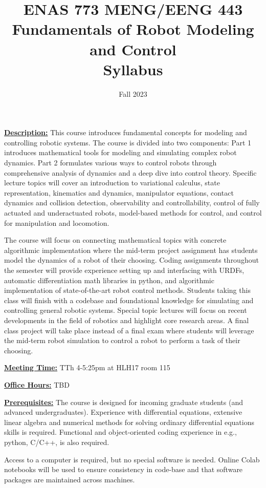 \documentclass[11pt,letterpaper]{article}
\title{ENAS 773 MENG/EENG 443  \\ Fundamentals of Robot Modeling and Control \\ Syllabus}
\author{Fall 2023}
\date{}
\newcommand{\mysec}[1]{\medskip\noindent\underline{\textbf{#1}}}
\begin{document}
\maketitle

\mysec{Description:}
This course introduces fundamental concepts for modeling and controlling robotic systems. The course is divided into two components: Part 1 introduces mathematical tools for modeling and simulating complex robot dynamics. Part 2 formulates various ways to control robots through comprehensive analysis of dynamics and a deep dive into control theory.  Specific lecture topics will cover an introduction to variational calculus, state representation, kinematics and dynamics, manipulator equations, contact dynamics and collision detection, observability and controllability, control of fully actuated and underactuated robots, model-based methods for control, and control for manipulation and locomotion. 

The course will focus on connecting mathematical topics with concrete algorithmic implementation where the mid-term project assignment has students model the dynamics of a robot of their choosing. Coding assignments throughout the semester will provide experience setting up and interfacing with URDFs, automatic differentiation math libraries in python, and algorithmic implementation of state-of-the-art robot control methods. Students taking this class will finish with a codebase and foundational knowledge for simulating and controlling general robotic systems. Special topic lectures will focus on recent developments in the field of robotics and highlight core research areas. A final class project will take place instead of a final exam where students will leverage the mid-term robot simulation to control a robot to perform a task of their choosing. 

\mysec{Meeting Time:} TTh 4-5:25pm at HLH17 room 115

\mysec{Office Hours:} TBD

\mysec{Prerequisites:} The course is designed for incoming graduate students (and advanced undergraduates). Experience with differential equations, extensive linear algebra and numerical methods for solving ordinary differential equations skills is required. Functional and object-oriented coding experience in e.g., python, C/C++, is also required.

Access to a computer is required, but no special software is needed. Online Colab notebooks will be used to ensure consistency in code-base and that software packages are maintained across machines. 
\end{document}
